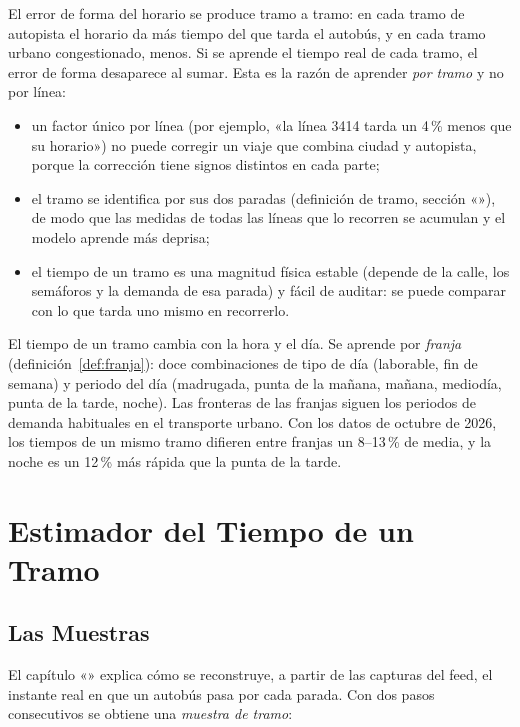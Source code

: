 El error de forma del horario se produce tramo a tramo: en cada tramo de autopista el horario da más tiempo del que
tarda el autobús, y en cada tramo urbano congestionado, menos. Si se aprende el tiempo real de cada tramo, el error de
forma desaparece al sumar. Esta es la razón de aprender \emph{por tramo} y no por línea:

\begin{itemize}
  \item un factor único por línea (por ejemplo, «la línea 3414 tarda un 4\,\% menos que su horario») no puede corregir
        un viaje que combina ciudad y autopista, porque la corrección tiene signos distintos en cada parte;
  \item el tramo se identifica por sus dos paradas (definición de tramo, sección «»), de modo que las
        medidas de todas las líneas que lo recorren se acumulan y el modelo aprende más deprisa;
  \item el tiempo de un tramo es una magnitud física estable (depende de la calle, los semáforos y la demanda de esa
        parada) y fácil de auditar: se puede comparar con lo que tarda uno mismo en recorrerlo.
\end{itemize}

El tiempo de un tramo cambia con la hora y el día. Se aprende por \emph{franja} (definición~\ref{def:franja}): doce
combinaciones de tipo de día (laborable, fin de semana) y periodo del día (madrugada, punta de la mañana, mañana,
mediodía, punta de la tarde, noche). Las fronteras de las franjas siguen los periodos de demanda habituales en el
transporte urbano. Con los datos de octubre de 2026, los tiempos de un mismo tramo difieren entre franjas un 8--13\,\%
de media, y la noche es un 12\,\% más rápida que la punta de la tarde.

\section{Estimador del Tiempo de un Tramo}
\label{sec:estimador-tramo}

\subsection{Las Muestras}

El capítulo «» explica cómo se reconstruye, a partir de las capturas del feed, el instante real en
que un autobús pasa por cada parada. Con dos pasos consecutivos se obtiene una \emph{muestra de tramo}:

